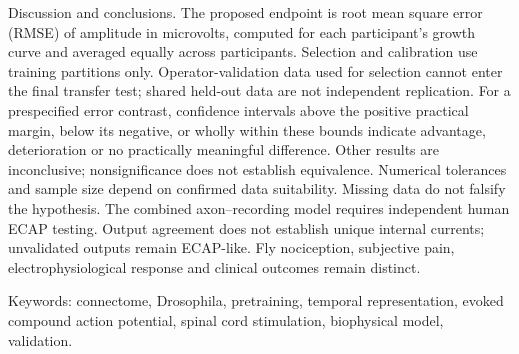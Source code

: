\documentclass[12pt,a4paper]{article}
\begin{document}
Discussion and conclusions. The proposed endpoint is root mean square error (RMSE) of amplitude in microvolts, computed for each participant's growth curve and averaged equally across participants. Selection and calibration use training partitions only. Operator-validation data used for selection cannot enter the final transfer test; shared held-out data are not independent replication. For a prespecified error contrast, confidence intervals above the positive practical margin, below its negative, or wholly within these bounds indicate advantage, deterioration or no practically meaningful difference. Other results are inconclusive; nonsignificance does not establish equivalence. Numerical tolerances and sample size depend on confirmed data suitability. Missing data do not falsify the hypothesis. The combined axon–recording model requires independent human ECAP testing. Output agreement does not establish unique internal currents; unvalidated outputs remain ECAP-like. Fly nociception, subjective pain, electrophysiological response and clinical outcomes remain distinct.\par
\noindent\begin{minipage}{\linewidth}Keywords: connectome, Drosophila, pretraining, temporal representation, evoked compound action potential, spinal cord stimulation, biophysical model, validation.\end{minipage}\par
\end{document}

